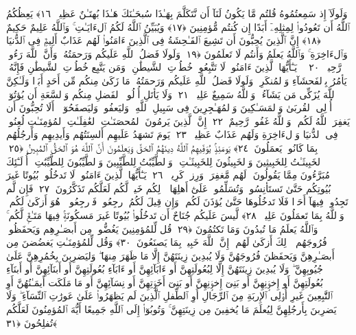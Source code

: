  وَلَولَآ إِذ سَمِعتُمُوهُ قُلتُم مَّا يَكُونُ لَنَآ أَن نَّتَكَلَّمَ بِهَـٰذَا سُبحَـٰنَكَ هَـٰذَا بُهتَـٰنٌ عَظِيمٌۭ ﴿١٦﴾
 يَعِظُكُمُ ٱللَّهُ أَن تَعُودُوا۟ لِمِثلِهِۦٓ أَبَدًا إِن كُنتُم مُّؤمِنِينَ ﴿١٧﴾
 وَيُبَيِّنُ ٱللَّهُ لَكُمُ ٱلءَايَـٰتِ ۚ وَٱللَّهُ عَلِيمٌ حَكِيمٌ ﴿١٨﴾
 إِنَّ ٱلَّذِينَ يُحِبُّونَ أَن تَشِيعَ ٱلفَـٰحِشَةُ فِى ٱلَّذِينَ ءَامَنُوا۟ لَهُم عَذَابٌ أَلِيمٌۭ فِى ٱلدُّنيَا وَٱلءَاخِرَةِ ۚ وَٱللَّهُ يَعلَمُ وَأَنتُم لَا تَعلَمُونَ ﴿١٩﴾
 وَلَولَا فَضلُ ٱللَّهِ عَلَيكُم وَرَحمَتُهُۥ وَأَنَّ ٱللَّهَ رَءُوفٌۭ رَّحِيمٌۭ ﴿٢٠﴾
 ۞ يَـٰٓأَيُّهَا ٱلَّذِينَ ءَامَنُوا۟ لَا تَتَّبِعُوا۟ خُطُوَٟتِ ٱلشَّيطَٰنِ ۚ وَمَن يَتَّبِع خُطُوَٟتِ ٱلشَّيطَٰنِ فَإِنَّهُۥ يَأمُرُ بِٱلفَحشَآءِ وَٱلمُنكَرِ ۚ وَلَولَا فَضلُ ٱللَّهِ عَلَيكُم وَرَحمَتُهُۥ مَا زَكَىٰ مِنكُم مِّن أَحَدٍ أَبَدًۭا وَلَـٰكِنَّ ٱللَّهَ يُزَكِّى مَن يَشَآءُ ۗ وَٱللَّهُ سَمِيعٌ عَلِيمٌۭ ﴿٢١﴾
 وَلَا يَأتَلِ أُو۟لُوا۟ ٱلفَضلِ مِنكُم وَٱلسَّعَةِ أَن يُؤتُوٓا۟ أُو۟لِى ٱلقُربَىٰ وَٱلمَسَـٰكِينَ وَٱلمُهَـٰجِرِينَ فِى سَبِيلِ ٱللَّهِ ۖ وَليَعفُوا۟ وَليَصفَحُوٓا۟ ۗ أَلَا تُحِبُّونَ أَن يَغفِرَ ٱللَّهُ لَكُم ۗ وَٱللَّهُ غَفُورٌۭ رَّحِيمٌ ﴿٢٢﴾
 إِنَّ ٱلَّذِينَ يَرمُونَ ٱلمُحصَنَـٰتِ ٱلغَٰفِلَـٰتِ ٱلمُؤمِنَـٰتِ لُعِنُوا۟ فِى ٱلدُّنيَا وَٱلءَاخِرَةِ وَلَهُم عَذَابٌ عَظِيمٌۭ ﴿٢٣﴾
 يَومَ تَشهَدُ عَلَيهِم أَلسِنَتُهُم وَأَيدِيهِم وَأَرجُلُهُم بِمَا كَانُوا۟ يَعمَلُونَ ﴿٢٤﴾
 يَومَئِذٍۢ يُوَفِّيهِمُ ٱللَّهُ دِينَهُمُ ٱلحَقَّ وَيَعلَمُونَ أَنَّ ٱللَّهَ هُوَ ٱلحَقُّ ٱلمُبِينُ ﴿٢٥﴾
 ٱلخَبِيثَـٰتُ لِلخَبِيثِينَ وَٱلخَبِيثُونَ لِلخَبِيثَـٰتِ ۖ وَٱلطَّيِّبَٰتُ لِلطَّيِّبِينَ وَٱلطَّيِّبُونَ لِلطَّيِّبَٰتِ ۚ أُو۟لَـٰٓئِكَ مُبَرَّءُونَ مِمَّا يَقُولُونَ ۖ لَهُم مَّغفِرَةٌۭ وَرِزقٌۭ كَرِيمٌۭ ﴿٢٦﴾
 يَـٰٓأَيُّهَا ٱلَّذِينَ ءَامَنُوا۟ لَا تَدخُلُوا۟ بُيُوتًا غَيرَ بُيُوتِكُم حَتَّىٰ تَستَأنِسُوا۟ وَتُسَلِّمُوا۟ عَلَىٰٓ أَهلِهَا ۚ ذَٟلِكُم خَيرٌۭ لَّكُم لَعَلَّكُم تَذَكَّرُونَ ﴿٢٧﴾
 فَإِن لَّم تَجِدُوا۟ فِيهَآ أَحَدًۭا فَلَا تَدخُلُوهَا حَتَّىٰ يُؤذَنَ لَكُم ۖ وَإِن قِيلَ لَكُمُ ٱرجِعُوا۟ فَٱرجِعُوا۟ ۖ هُوَ أَزكَىٰ لَكُم ۚ وَٱللَّهُ بِمَا تَعمَلُونَ عَلِيمٌۭ ﴿٢٨﴾
 لَّيسَ عَلَيكُم جُنَاحٌ أَن تَدخُلُوا۟ بُيُوتًا غَيرَ مَسكُونَةٍۢ فِيهَا مَتَـٰعٌۭ لَّكُم ۚ وَٱللَّهُ يَعلَمُ مَا تُبدُونَ وَمَا تَكتُمُونَ ﴿٢٩﴾
 قُل لِّلمُؤمِنِينَ يَغُضُّوا۟ مِن أَبصَـٰرِهِم وَيَحفَظُوا۟ فُرُوجَهُم ۚ ذَٟلِكَ أَزكَىٰ لَهُم ۗ إِنَّ ٱللَّهَ خَبِيرٌۢ بِمَا يَصنَعُونَ ﴿٣٠﴾
 وَقُل لِّلمُؤمِنَـٰتِ يَغضُضنَ مِن أَبصَـٰرِهِنَّ وَيَحفَظنَ فُرُوجَهُنَّ وَلَا يُبدِينَ زِينَتَهُنَّ إِلَّا مَا ظَهَرَ مِنهَا ۖ وَليَضرِبنَ بِخُمُرِهِنَّ عَلَىٰ جُيُوبِهِنَّ ۖ وَلَا يُبدِينَ زِينَتَهُنَّ إِلَّا لِبُعُولَتِهِنَّ أَو ءَابَآئِهِنَّ أَو ءَابَآءِ بُعُولَتِهِنَّ أَو أَبنَآئِهِنَّ أَو أَبنَآءِ بُعُولَتِهِنَّ أَو إِخوَٟنِهِنَّ أَو بَنِىٓ إِخوَٟنِهِنَّ أَو بَنِىٓ أَخَوَٟتِهِنَّ أَو نِسَآئِهِنَّ أَو مَا مَلَكَت أَيمَـٰنُهُنَّ أَوِ ٱلتَّٰبِعِينَ غَيرِ أُو۟لِى ٱلإِربَةِ مِنَ ٱلرِّجَالِ أَوِ ٱلطِّفلِ ٱلَّذِينَ لَم يَظهَرُوا۟ عَلَىٰ عَورَٰتِ ٱلنِّسَآءِ ۖ وَلَا يَضرِبنَ بِأَرجُلِهِنَّ لِيُعلَمَ مَا يُخفِينَ مِن زِينَتِهِنَّ ۚ وَتُوبُوٓا۟ إِلَى ٱللَّهِ جَمِيعًا أَيُّهَ ٱلمُؤمِنُونَ لَعَلَّكُم تُفلِحُونَ ﴿٣١﴾
